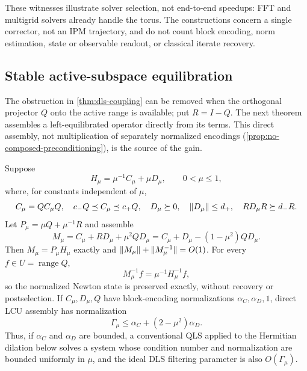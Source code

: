 These witnesses illustrate solver selection, not end-to-end speedups: FFT
and multigrid solvers already handle the torus.  The constructions concern
a single corrector, not an IPM trajectory, and do not count block encoding,
norm estimation, state or observable readout, or classical iterate
recovery.

\subsection{Stable active-subspace equilibration}
\label{sec:stable-active-equilibration}

The obstruction in \cref{thm:dls-coupling} can be removed when the
orthogonal projector $Q$ onto the active range is available; put $R=I-Q$.
The next theorem assembles a left-equilibrated operator directly from its
terms.  This direct assembly, not multiplication of separately normalized
encodings (\cref{prop:no-composed-preconditioning}), is the source of the
gain.

\begin{theorem}
\label{thm:stable-split-equilibration}
Suppose
\[
 H_\mu=\mu^{-1}C_\mu+\mu D_\mu,\qquad 0<\mu\leq1,
\]
where, for constants independent of $\mu$,
\[
 C_\mu=QC_\mu Q,\quad
 c_-Q\preceq C_\mu\preceq c_+Q,\quad
 D_\mu\succeq0,\quad \lVert D_\mu\rVert\leq d_+,\quad
 RD_\mu R\succeq d_-R.
\]
Let $P_\mu=\mu Q+\mu^{-1}R$ and assemble
\begin{equation}
 M_\mu=C_\mu+RD_\mu+\mu^2QD_\mu
 =C_\mu+D_\mu-(1-\mu^2)QD_\mu.
 \label{eq:stable-split-operator}
\end{equation}
Then $M_\mu=P_\mu H_\mu$ exactly and
$\lVert M_\mu\rVert+\lVert M_\mu^{-1}\rVert=O(1)$.  For every
$f\in U=\operatorname{range}Q$,
\begin{equation}
 M_\mu^{-1}f=\mu^{-1}H_\mu^{-1}f,
 \label{eq:stable-state-preservation}
\end{equation}
so the normalized Newton state is preserved exactly, without recovery or
postselection.  If $C_\mu,D_\mu,Q$ have block-encoding normalizations
$\alpha_C,\alpha_D,1$, direct LCU assembly has normalization
\begin{equation}
 \Gamma_\mu\leq\alpha_C+(2-\mu^2)\alpha_D.
 \label{eq:stable-lcu-normalization}
\end{equation}
Thus, if $\alpha_C$ and $\alpha_D$ are bounded, a conventional QLS applied
to the Hermitian dilation below solves a system whose condition number and
normalization are bounded uniformly in $\mu$, and the ideal DLS filtering
parameter is also $O(\Gamma_\mu)$.
\end{theorem}


